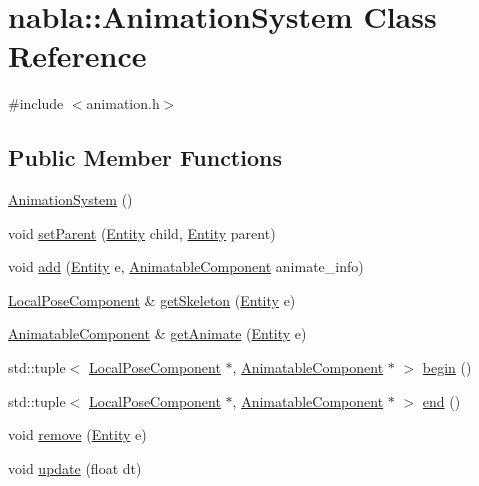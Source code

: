 \hypertarget{classnabla_1_1_animation_system}{}\section{nabla\+::Animation\+System Class Reference}
\label{classnabla_1_1_animation_system}


{\ttfamily \#include $<$animation.\+h$>$}

\subsection*{Public Member Functions}
\begin{DoxyCompactItemize}
\item 
\mbox{\hyperlink{classnabla_1_1_animation_system_aa81c13b7ca265de5bddd85ca315d989b}{Animation\+System}} ()
\item 
void \mbox{\hyperlink{classnabla_1_1_animation_system_a11a13061b373dde465d20615b35535a0}{set\+Parent}} (\mbox{\hyperlink{structnabla_1_1_entity}{Entity}} child, \mbox{\hyperlink{structnabla_1_1_entity}{Entity}} parent)
\item 
void \mbox{\hyperlink{classnabla_1_1_animation_system_abdd187b0c5bae290de66e90b5b04ae71}{add}} (\mbox{\hyperlink{structnabla_1_1_entity}{Entity}} e, \mbox{\hyperlink{structnabla_1_1_animatable_component}{Animatable\+Component}} animate\+\_\+info)
\item 
\mbox{\hyperlink{structnabla_1_1_local_pose_component}{Local\+Pose\+Component}} \& \mbox{\hyperlink{classnabla_1_1_animation_system_a040b464a66763e67f1f557d9a14236b3}{get\+Skeleton}} (\mbox{\hyperlink{structnabla_1_1_entity}{Entity}} e)
\item 
\mbox{\hyperlink{structnabla_1_1_animatable_component}{Animatable\+Component}} \& \mbox{\hyperlink{classnabla_1_1_animation_system_a2127a38740a50f1556417b0350c28c90}{get\+Animate}} (\mbox{\hyperlink{structnabla_1_1_entity}{Entity}} e)
\item 
std\+::tuple$<$ \mbox{\hyperlink{structnabla_1_1_local_pose_component}{Local\+Pose\+Component}} $\ast$, \mbox{\hyperlink{structnabla_1_1_animatable_component}{Animatable\+Component}} $\ast$ $>$ \mbox{\hyperlink{classnabla_1_1_animation_system_adf41e641caa9f5c0f63b493693c97937}{begin}} ()
\item 
std\+::tuple$<$ \mbox{\hyperlink{structnabla_1_1_local_pose_component}{Local\+Pose\+Component}} $\ast$, \mbox{\hyperlink{structnabla_1_1_animatable_component}{Animatable\+Component}} $\ast$ $>$ \mbox{\hyperlink{classnabla_1_1_animation_system_aa8766d6a9b932c9ee32a396d2a633300}{end}} ()
\item 
void \mbox{\hyperlink{classnabla_1_1_animation_system_a8cf322b787134b6ea6563adea102ea6d}{remove}} (\mbox{\hyperlink{structnabla_1_1_entity}{Entity}} e)
\item 
void \mbox{\hyperlink{classnabla_1_1_animation_system_ac5231e59d5e026f305e574b0dc5e9d78}{update}} (float dt)
\end{DoxyCompactItemize}


